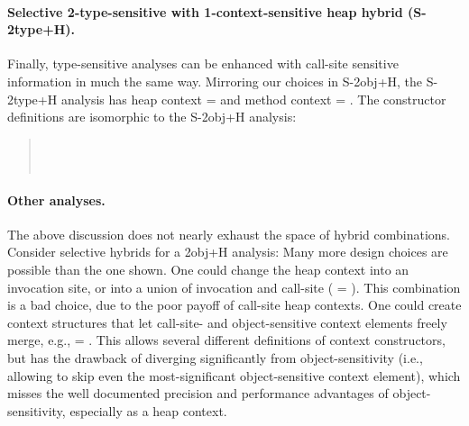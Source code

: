 \paragraph{Selective 2-type-sensitive with 1-context-sensitive heap hybrid (S-2type+H).}

Finally, type-sensitive analyses can be enhanced with call-site
sensitive information in much the same way.  Mirroring our choices in
S-2obj+H, the S-2type+H analysis has heap context  = 
and method context  = .
The constructor definitions are isomorphic to the S-2obj+H analysis:
\begin{quote}
 \\
 \\
\end{quote}

\paragraph{Other analyses.}
The above discussion does not nearly exhaust the space of hybrid
combinations. Consider selective hybrids for a 2obj+H analysis: Many
more design choices are possible than the one shown. One could change
the heap context into an invocation site, or into a union of
invocation and call-site ( = ). This
combination is a bad choice, due to the poor payoff of call-site heap
contexts. One could create context structures that let call-site- and
object-sensitive context elements freely merge, e.g.,  =
.  This allows several different definitions of context
constructors, but has the drawback of diverging significantly from
object-sensitivity (i.e., allowing to skip even the most-significant
object-sensitive context element), which misses the well documented
precision and performance advantages of object-sensitivity, especially
as a heap context.



